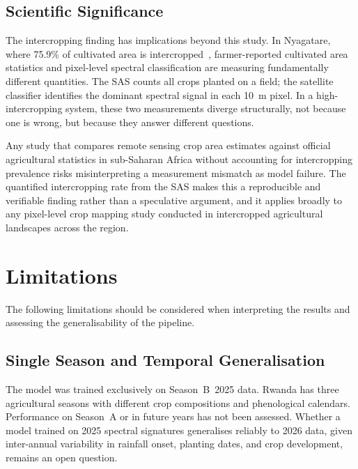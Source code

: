 \subsection{Scientific Significance}
\label{subsec:sig_scientific}

The intercropping finding has implications beyond this study.
In Nyagatare, where 75.9\% of cultivated area is
intercropped~\cite{nisr2025sas}, farmer-reported cultivated
area statistics and pixel-level spectral classification are
measuring fundamentally different quantities. The SAS counts
all crops planted on a field; the satellite classifier
identifies the dominant spectral signal in each 10~m pixel.
In a high-intercropping system, these two measurements diverge
structurally, not because one is wrong, but because they
answer different questions.

Any study that compares remote sensing crop area estimates
against official agricultural statistics in sub-Saharan Africa
without accounting for intercropping prevalence risks
misinterpreting a measurement mismatch as model failure. The
quantified intercropping rate from the SAS makes this a
reproducible and verifiable finding rather than a speculative
argument, and it applies broadly to any pixel-level crop
mapping study conducted in intercropped agricultural landscapes
across the region.


\section{Limitations}
\label{sec:limitations}

The following limitations should be considered when interpreting
the results and assessing the generalisability of the pipeline.


\subsection*{Single Season and Temporal Generalisation}

The model was trained exclusively on Season~B~2025 data. Rwanda
has three agricultural seasons with different crop compositions
and phenological calendars. Performance on Season~A or in future
years has not been assessed. Whether a model trained on 2025
spectral signatures generalises reliably to 2026 data, given
inter-annual variability in rainfall onset, planting dates, and
crop development, remains an open question.


